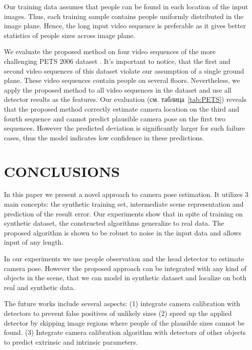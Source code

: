 Our training data assumes that people can be found in each location of the input images. Thus, each training sample contains people uniformly distributed in the image plane. Hence, the long input video sequence is preferable as it gives better statistics of people sizes across image plane.

We evaluate the proposed method on four video sequences of the more challenging PETS 2006 dataset \cite{thirde2006overview}. It's important to notice, that the first and second video sequences of this dataset violate our assumption of a single ground plane. These video sequences contain people on several floors. Nevertheless, we apply the proposed method to all video sequences in the dataset and use all detector results as the features. Our evaluation (см. таблица~\ref{tab:PETS}) reveals that the proposed method correctly estimate camera location on the third and fourth sequence and cannot predict plausible camera pose on the first two sequences. However the predicted deviation is significantly larger for such failure cases, thus the model indicates low confidence in these predictions.

\section{\uppercase{Conclusions}}

In this paper we present a novel approach to camera pose estimation. It utilizes 3 main concepts: the synthetic training set, intermediate scene representation and prediction of the result error. Our experiments show that in spite of training on synthetic dataset, the constructed algorithms generalize to real data. The proposed algorithm is shown to be robust to noise in the input data and allows input of any length.

In our experiments we use people observation and the head detector \cite{prisacariu2009fasthog} to estimate camera pose. However the proposed approach can be integrated with any kind of objects in the scene, that we can model in synthetic dataset and localize on both real and synthetic data.

The future works include several aspects: (1) integrate camera calibration with detectors to prevent false positives of unlikely sizes (2) speed up the applied detector by skipping image regions where people of the plausible sizes cannot be found. (3) Integrate camera calibration algorithm with detectors of other objects to predict extrinsic and intrinsic parameters.

